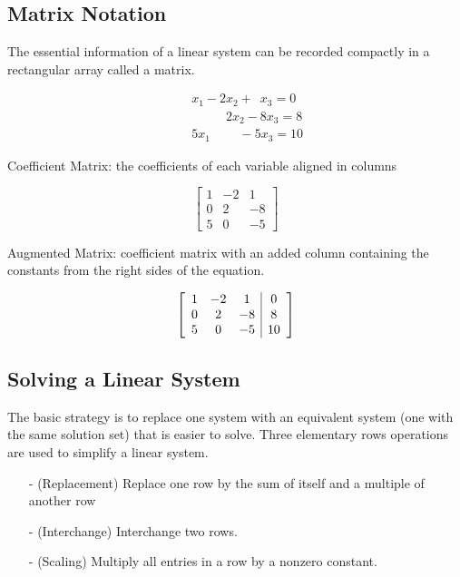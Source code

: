 \documentclass{article}
\begin{document}
\subsection{Matrix Notation}

The essential information of a linear system can be recorded compactly in a rectangular array called a matrix.

\begin{align*}
    \quad & x_1 - 2x_2 + \phantom{0} x_3 = 0 \\
    \quad & \phantom{1x_1+} 2x_2 -8x_3 = 8\\
    \quad & 5x_1 \phantom{+2x_2} -5x_3 = 10
\end{align*}

\pagebreak
Coefficient Matrix: the coefficients of each variable aligned in columns

$$\begin{bmatrix}
    1&-2&1\\
    0&2&-8\\
    5&0&-5
\end{bmatrix}$$

\noindent Augmented Matrix: coefficient matrix with an added column containing the constants from the right sides of the equation. \newline

$$\left[\begin{array}{ccc|c}
    1&-2&1&0 \\
    0&2&-8&8 \\
    5&0&-5&10 \pagebreak
\end{array}\right]$$

\subsection {Solving a Linear System}

The basic strategy is to replace one system with an equivalent system (one with the same solution set) that is easier to solve. Three elementary rows operations are used to simplify a linear system. 

\begin{itemize}
    \item[-] (Replacement) Replace one row by the sum of itself and a multiple of another row
    \item[-] (Interchange) Interchange two rows.
    \item[-] (Scaling) Multiply all entries in a row by a nonzero constant.
\end{itemize}
\end{document}
